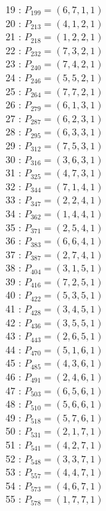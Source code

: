 \documentclass{article}
\begin{document}
{\begin{multicols}{2}
19 : $P_{199}=( 6, 7, 1, 1 )$\\
20 : $P_{213}=( 4, 1, 2, 1 )$\\
21 : $P_{218}=( 1, 2, 2, 1 )$\\
22 : $P_{232}=( 7, 3, 2, 1 )$\\
23 : $P_{240}=( 7, 4, 2, 1 )$\\
24 : $P_{246}=( 5, 5, 2, 1 )$\\
25 : $P_{264}=( 7, 7, 2, 1 )$\\
26 : $P_{279}=( 6, 1, 3, 1 )$\\
27 : $P_{287}=( 6, 2, 3, 1 )$\\
28 : $P_{295}=( 6, 3, 3, 1 )$\\
29 : $P_{312}=( 7, 5, 3, 1 )$\\
30 : $P_{316}=( 3, 6, 3, 1 )$\\
31 : $P_{325}=( 4, 7, 3, 1 )$\\
32 : $P_{344}=( 7, 1, 4, 1 )$\\
33 : $P_{347}=( 2, 2, 4, 1 )$\\
34 : $P_{362}=( 1, 4, 4, 1 )$\\
35 : $P_{371}=( 2, 5, 4, 1 )$\\
36 : $P_{383}=( 6, 6, 4, 1 )$\\
37 : $P_{387}=( 2, 7, 4, 1 )$\\
38 : $P_{404}=( 3, 1, 5, 1 )$\\
39 : $P_{416}=( 7, 2, 5, 1 )$\\
40 : $P_{422}=( 5, 3, 5, 1 )$\\
41 : $P_{428}=( 3, 4, 5, 1 )$\\
42 : $P_{436}=( 3, 5, 5, 1 )$\\
43 : $P_{443}=( 2, 6, 5, 1 )$\\
44 : $P_{470}=( 5, 1, 6, 1 )$\\
45 : $P_{485}=( 4, 3, 6, 1 )$\\
46 : $P_{491}=( 2, 4, 6, 1 )$\\
47 : $P_{503}=( 6, 5, 6, 1 )$\\
48 : $P_{510}=( 5, 6, 6, 1 )$\\
49 : $P_{518}=( 5, 7, 6, 1 )$\\
50 : $P_{531}=( 2, 1, 7, 1 )$\\
51 : $P_{541}=( 4, 2, 7, 1 )$\\
52 : $P_{548}=( 3, 3, 7, 1 )$\\
53 : $P_{557}=( 4, 4, 7, 1 )$\\
54 : $P_{573}=( 4, 6, 7, 1 )$\\
55 : $P_{578}=( 1, 7, 7, 1 )$\\
\end{multicols}
}
\end{document}
